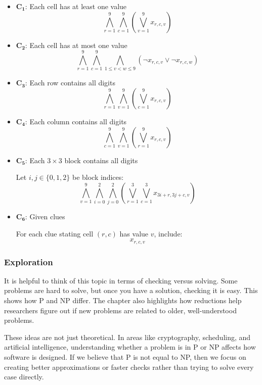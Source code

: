 \documentclass{article}
\theoremstyle{theorem}
\theoremstyle{definition}
\theoremstyle{remark}
\begin{document}
\begin{itemize}
    \item \(\mathbf{C_1}\): Each cell has at least one value
    \[
    \bigwedge_{r=1}^{9} \bigwedge_{c=1}^{9} \left( \bigvee_{v=1}^{9} x_{r,c,v} \right)
    \]

    \item \(\mathbf{C_2}\): Each cell has at most one value
    \[
    \bigwedge_{r=1}^{9} \bigwedge_{c=1}^{9} \bigwedge_{1 \leq v < w \leq 9} (\neg x_{r,c,v} \lor \neg x_{r,c,w})
    \]

    \item \(\mathbf{C_3}\): Each row contains all digits
    \[
    \bigwedge_{r=1}^{9} \bigwedge_{v=1}^{9} \left( \bigvee_{c=1}^{9} x_{r,c,v} \right)
    \]

    \item \(\mathbf{C_4}\): Each column contains all digits
    \[
    \bigwedge_{c=1}^{9} \bigwedge_{v=1}^{9} \left( \bigvee_{r=1}^{9} x_{r,c,v} \right)
    \]

    \item \(\mathbf{C_5}\): Each \(3 \times 3\) block contains all digits

    Let \(i, j \in \{0, 1, 2\}\) be block indices:
    \[
    \bigwedge_{v=1}^{9} \bigwedge_{i=0}^{2} \bigwedge_{j=0}^{2} \left( \bigvee_{r=1}^{3} \bigvee_{c=1}^{3} x_{3i + r, 3j + c, v} \right)
    \]

    \item \(\mathbf{C_6}\): Given clues

    For each clue stating cell \((r,c)\) has value \(v\), include:
    \[
    x_{r,c,v}
    \]
\end{itemize}


\subsubsection{Exploration}

It is helpful to think of this topic in terms of checking versus solving. Some problems are hard to solve, but once you have a solution, checking it is easy. This shows how P and NP differ. The chapter also highlights how reductions help researchers figure out if new problems are related to older, well-understood problems.

These ideas are not just theoretical. In areas like cryptography, scheduling, and artificial intelligence, understanding whether a problem is in P or NP affects how software is designed. If we believe that P is not equal to NP, then we focus on creating better approximations or faster checks rather than trying to solve every case directly.
\end{document}
